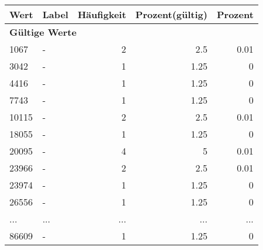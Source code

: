      \begin{longtable}{lXrrr}
     \toprule
     \textbf{Wert} & \textbf{Label} & \textbf{Häufigkeit} & \textbf{Prozent(gültig)} & \textbf{Prozent} \\
     \endhead
     \midrule
     \multicolumn{5}{l}{\textbf{Gültige Werte}}\\
        1067 & \multicolumn{1}{X}{-} & %
          \num{2} &
          \num[round-mode=places,round-precision=2]{2.5} &
          \num[round-mode=places,round-precision=2]{0.01} \\
        3042 & \multicolumn{1}{X}{-} & %
          \num{1} &
          \num[round-mode=places,round-precision=2]{1.25} &
          \num[round-mode=places,round-precision=2]{0} \\
        4416 & \multicolumn{1}{X}{-} & %
          \num{1} &
          \num[round-mode=places,round-precision=2]{1.25} &
          \num[round-mode=places,round-precision=2]{0} \\
        7743 & \multicolumn{1}{X}{-} & %
          \num{1} &
          \num[round-mode=places,round-precision=2]{1.25} &
          \num[round-mode=places,round-precision=2]{0} \\
        10115 & \multicolumn{1}{X}{-} & %
          \num{2} &
          \num[round-mode=places,round-precision=2]{2.5} &
          \num[round-mode=places,round-precision=2]{0.01} \\
        18055 & \multicolumn{1}{X}{-} & %
          \num{1} &
          \num[round-mode=places,round-precision=2]{1.25} &
          \num[round-mode=places,round-precision=2]{0} \\
        20095 & \multicolumn{1}{X}{-} & %
          \num{4} &
          \num[round-mode=places,round-precision=2]{5} &
          \num[round-mode=places,round-precision=2]{0.01} \\
        23966 & \multicolumn{1}{X}{-} & %
          \num{2} &
          \num[round-mode=places,round-precision=2]{2.5} &
          \num[round-mode=places,round-precision=2]{0.01} \\
        23974 & \multicolumn{1}{X}{-} & %
          \num{1} &
          \num[round-mode=places,round-precision=2]{1.25} &
          \num[round-mode=places,round-precision=2]{0} \\
        26556 & \multicolumn{1}{X}{-} & %
          \num{1} &
          \num[round-mode=places,round-precision=2]{1.25} &
          \num[round-mode=places,round-precision=2]{0} \\
       ... & ... & ... & ... & ... \\
        86609 & \multicolumn{1}{X}{-} & %
          \num{1} &
          \num[round-mode=places,round-precision=2]{1.25} &
          \num[round-mode=places,round-precision=2]{0} \\


\end{longtable}

